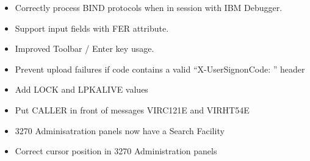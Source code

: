\documentclass[letterpaper,10pt,english]{sphinxmanual}
\begin{document}
\begin{itemize}
\item {} 
Correctly process BIND protocols when in session with IBM Debugger.

\end{itemize}

\begin{itemize}
\item {} 
Support input fields with FER attribute.

\end{itemize}

\begin{itemize}
\item {} 
Improved Toolbar / Enter key usage.

\end{itemize}

\begin{itemize}
\item {} 
Prevent upload failures if code contains a valid  “X-UserSignonCode: ” header

\end{itemize}

\begin{itemize}
\item {} 
Add LOCK and LPKALIVE values

\end{itemize}

\begin{itemize}
\item {} 
Put CALLER in front of messages VIRC121E and VIRHT54E

\end{itemize}

\begin{itemize}
\item {} 
3270 Adminisatration panels now have a Search Facility

\end{itemize}

\begin{itemize}
\item {} 
Correct cursor position in 3270 Administration panels

\end{itemize}
\end{document}
